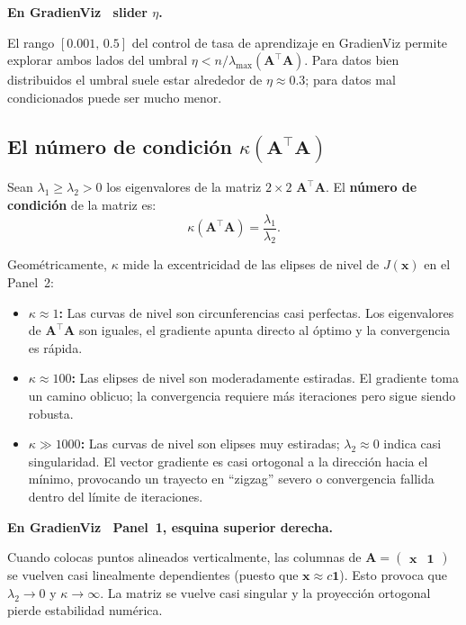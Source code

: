﻿\documentclass[12pt, a4paper]{article}
\newenvironment{viznota}[1]{%
    \begin{mdframed}[style=vizverde]
    \textbf{\color{bordeteo}En GradienViz \textemdash\ #1.}\quad
}{%
    \end{mdframed}
}
\newcommand{\T}{{\top}}
\begin{document}
\begin{viznota}{slider $\eta$}
El rango $[0.001,\, 0.5]$ del control de tasa de aprendizaje en GradienViz permite explorar ambos lados del umbral $\eta < n/\lambda_{\max}(\mathbf{A}^\T\mathbf{A})$. Para datos bien distribuidos el umbral suele estar alrededor de $\eta \approx 0.3$; para datos mal condicionados puede ser mucho menor.
\end{viznota}

\subsection{El número de condición $\kappa(\mathbf{A}^\T \mathbf{A})$}

Sean $\lambda_1 \ge \lambda_2 > 0$ los eigenvalores de la matriz $2 \times 2$ $\mathbf{A}^\T \mathbf{A}$. El \textbf{número de condición} de la matriz es:
\begin{equation}\label{eq:kappa_lin}
    \kappa(\mathbf{A}^\T \mathbf{A}) = \frac{\lambda_1}{\lambda_2}.
\end{equation}

Geométricamente, $\kappa$ mide la excentricidad de las elipses de nivel de $J(\mathbf{x})$ en el Panel~2:
\begin{itemize}
    \item \textbf{$\kappa \approx 1$:} Las curvas de nivel son circunferencias casi perfectas. Los eigenvalores de $\mathbf{A}^\T\mathbf{A}$ son iguales, el gradiente apunta directo al óptimo y la convergencia es rápida.
    \item \textbf{$\kappa \approx 100$:} Las elipses de nivel son moderadamente estiradas. El gradiente toma un camino oblicuo; la convergencia requiere más iteraciones pero sigue siendo robusta.
    \item \textbf{$\kappa \gg 1000$:} Las curvas de nivel son elipses muy estiradas; $\lambda_2 \approx 0$ indica casi singularidad. El vector gradiente es casi ortogonal a la dirección hacia el mínimo, provocando un trayecto en ``zigzag'' severo o convergencia fallida dentro del límite de iteraciones.
\end{itemize}

\begin{viznota}{Panel~1, esquina superior derecha}
Cuando colocas puntos alineados verticalmente, las columnas de $\mathbf{A} = \begin{pmatrix} \mathbf{x} & \mathbf{1} \end{pmatrix}$ se vuelven casi linealmente dependientes (puesto que $\mathbf{x} \approx c \mathbf{1}$). Esto provoca que $\lambda_2 \to 0$ y $\kappa \to \infty$. La matriz se vuelve casi singular y la proyección ortogonal pierde estabilidad numérica.
\end{viznota}
\end{document}
